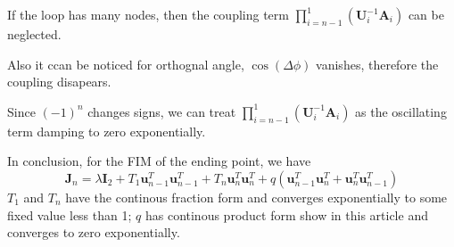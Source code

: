 \documentclass[12pt]{article}
\begin{document}
If the loop has many nodes, then the coupling term $\prod_{i=n-1}^1 (\bm{U}_i^{-1}\bm{A}_i)$ can be neglected.

Also it ccan be noticed for orthognal angle, $\cos(\Delta \phi)$ vanishes, therefore the coupling disapears.

Since $(-1)^n$ changes signs, we can treat $\prod_{i=n-1}^1 (\bm{U}_i^{-1}\bm{A}_i)$ as the oscillating term damping to zero exponentially.

In conclusion, for the FIM of the ending point, we have
\[
\bm{J}_n=\lambda\bm{I}_2+T_1\bm{u}_{n-1}^T\bm{u}_{n-1}^T+T_n\bm{u}_n^T\bm{u}_n^T+q(\bm{u}_{n-1}^T\bm{u}_{n}^T+\bm{u}_{n}^T\bm{u}_{n-1}^T)
\]
$T_1$ and $T_n$ have the continous fraction form and converges exponentially to some fixed value less than 1;
$q$ has continous product form show in this article and converges to zero exponentially.
%
\end{document}
